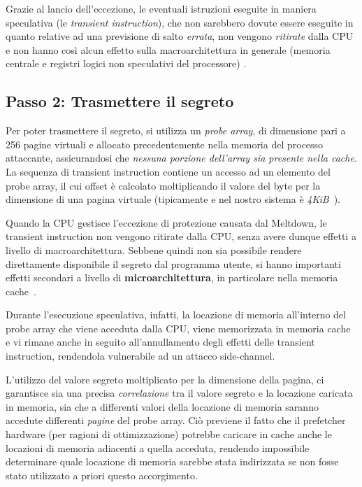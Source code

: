 Grazie al lancio dell'eccezione, le eventuali istruzioni eseguite in maniera speculativa (le \emph{transient instruction}), che non sarebbero dovute essere eseguite in quanto relative ad una previsione di salto \emph{errata}, non vengono \emph{ritirate} dalla CPU e non hanno così alcun effetto sulla macroarchitettura in generale (memoria centrale e registri logici non speculativi del processore) \cite{frosini:calcolatori2}.

\subsection{Passo 2: Trasmettere il segreto}
\label{sec:meltdown-passo-2}
Per poter trasmettere il segreto, si utilizza un \emph{probe array}, di dimensione pari a 256 pagine virtuali e allocato precedentemente nella memoria del processo attaccante, assicurandosi che \emph{nessuna porzione dell'array sia presente nella cache}. 
La sequenza di transient instruction contiene un accesso ad un elemento del probe array, il cui offset è calcolato moltiplicando il valore del byte per la dimensione di una pagina virtuale (tipicamente e nel nostro sistema  è \emph{4KiB}~\cite{lettieri:paginazione}).

Quando la CPU gestisce l'eccezione di protezione causata dal Meltdown, le transient instruction non vengono ritirate dalla CPU, senza avere dunque effetti a livello di macroarchitettura. Sebbene quindi non sia possibile rendere direttamente disponibile il segreto dal programma utente, si hanno importanti effetti secondari a livello di \textbf{microarchitettura}, in particolare nella memoria cache~\cite{lipp:meltdown}.

Durante l'esecuzione speculativa, infatti, la locazione di memoria all'interno del probe array che viene acceduta dalla CPU, viene memorizzata in memoria cache e vi rimane anche in seguito all'annullamento degli effetti delle transient instruction, rendendola vulnerabile ad un attacco side-channel.

L'utilizzo del valore segreto moltiplicato per la dimensione della pagina, ci garantisce sia una precisa \emph{correlazione} tra il valore segreto e la locazione caricata in memoria, sia che a differenti valori della locazione di memoria saranno accedute differenti \emph{pagine} del probe array.
Ciò previene il fatto che il prefetcher hardware (per ragioni di ottimizzazione) potrebbe caricare in cache anche le locazioni di memoria adiacenti a quella acceduta, rendendo impossibile determinare quale locazione di memoria sarebbe stata indirizzata se non fosse stato utilizzato a priori questo accorgimento.

